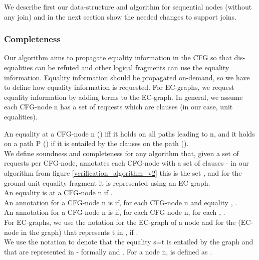 We describe first our data-structure and algorithm for sequential nodes (without any join) and in the next section show the needed changes to support joins.

\subsubsection*{Completeness}
Our algorithm aims to propagate equality information in the CFG so that dis-equalities can be refuted and other logical fragments can use the equality information. Equality information should be propagated on-demand, so we have to define how equality information is requested. For EC-graphs, we request equality information by adding terms to the EC-graph. 
In general, we assume each CFG-node n has a set of requests  which are clauses (in our case, unit equalities).

An equality   at a CFG-node n () iff it holds on all paths leading to n, and it holds on a path P () if it is entailed by the clauses on the path ().\\
We define soundness and completeness for any algorithm that, given a set of requests  per CFG-node, annotates each CFG-node with a set of clauses   - in our algorithm from figure \ref{verification_algorithm_v2} this is the set , and for the ground unit equality fragment it is represented using an EC-graph.\\
An equality  is  at a CFG-node n if .\\
An annotation for a CFG-node n is  if, for each CFG-node n and equality , .\\
An annotation for a CFG-node n is  if, for each CFG-node n, for each , .\\
For EC-graphs, we use the notation  for the EC-graph of a node  and  for the \GT{} (EC-node in the graph) that represents t in , if .\\
We use the notation  to denote that the equality s=t is entailed by the graph  and that  are represented in  - formally  and . For a node n,  is defined as . 

